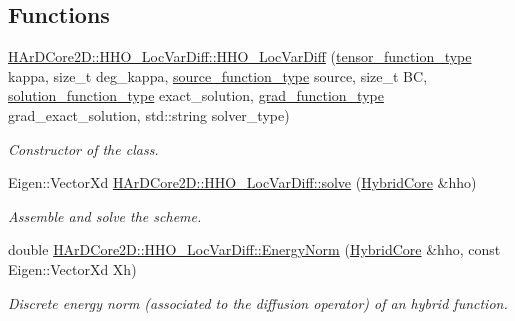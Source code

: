 \subsection*{Functions}
\begin{DoxyCompactItemize}
\item 
\hyperlink{group__HHO__LocVarDiff_ga5f2ab34d1e5afb3d83b548a1cb09f83a}{H\+Ar\+D\+Core2\+D\+::\+H\+H\+O\+\_\+\+Loc\+Var\+Diff\+::\+H\+H\+O\+\_\+\+Loc\+Var\+Diff} (\hyperlink{classHArDCore2D_1_1HHO__LocVarDiff_a15bd0c2320b456efcc07c11842c13492}{tensor\+\_\+function\+\_\+type} kappa, size\+\_\+t deg\+\_\+kappa, \hyperlink{classHArDCore2D_1_1HHO__LocVarDiff_a0bd07aa3ccc1aa9dd3c9573a5ab1c7dd}{source\+\_\+function\+\_\+type} source, size\+\_\+t BC, \hyperlink{classHArDCore2D_1_1HHO__LocVarDiff_a8bb87b6170b8a77e14d343bf76cac3d6}{solution\+\_\+function\+\_\+type} exact\+\_\+solution, \hyperlink{classHArDCore2D_1_1HHO__LocVarDiff_a00b073818ecee542bb74860b1c204d49}{grad\+\_\+function\+\_\+type} grad\+\_\+exact\+\_\+solution, std\+::string solver\+\_\+type)
\begin{DoxyCompactList}\small\item\em Constructor of the class. \end{DoxyCompactList}\item 
\mbox{\label{group__HHO__LocVarDiff_ga74eac0904256440c429fb9502112a867}} 
Eigen\+::\+Vector\+Xd \hyperlink{group__HHO__LocVarDiff_ga74eac0904256440c429fb9502112a867}{H\+Ar\+D\+Core2\+D\+::\+H\+H\+O\+\_\+\+Loc\+Var\+Diff\+::solve} (\hyperlink{classHArDCore2D_1_1HybridCore}{Hybrid\+Core} \&hho)
\begin{DoxyCompactList}\small\item\em Assemble and solve the scheme. \end{DoxyCompactList}\item 
\mbox{\label{group__HHO__LocVarDiff_gaf359d2047dc5b2fb8640a01c025fb860}} 
double \hyperlink{group__HHO__LocVarDiff_gaf359d2047dc5b2fb8640a01c025fb860}{H\+Ar\+D\+Core2\+D\+::\+H\+H\+O\+\_\+\+Loc\+Var\+Diff\+::\+Energy\+Norm} (\hyperlink{classHArDCore2D_1_1HybridCore}{Hybrid\+Core} \&hho, const Eigen\+::\+Vector\+Xd Xh)
\begin{DoxyCompactList}\small\item\em Discrete energy norm (associated to the diffusion operator) of an hybrid function. \end{DoxyCompactList}\item 

\end{DoxyCompactItemize}
